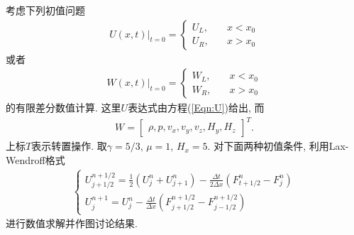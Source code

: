 \documentclass[10.5pt
]{article}
\begin{document}
考虑下列初值问题
\begin{align}
U(x,t)|_{t=0} = \left\{ \begin{array}{ll}
U_L, & \quad x < x_0 \\
U_R, & \quad x > x_0
\end{array} \right.
\end{align}
或者
\begin{align}
W(x,t)|_{t=0} = \left\{ \begin{array}{ll}
W_L, & \quad x < x_0 \\
W_R, & \quad x > x_0
\end{array} \right.
\end{align}
的有限差分数值计算. 这里$U$表达式由方程(\ref{Eqn:U})给出, 而
\begin{align}
W = \left[ \begin{array}{ccccccc}
\rho,
p,
v_x,
v_y,
v_z,
H_y,
H_z
\end{array} \right]^T.
\end{align}
上标$T$表示转置操作. 取$\gamma=5/3$, $\mu=1$, $H_x=5$. 对下面两种初值条件,
利用Lax-Wendroff格式\citep{Zheng2019}
\begin{align}
\left\{\begin{array}{ll}{U_{j+1 / 2}^{n+1 / 2}=\frac{1}{2}\left(U_{j}^{n}+U_{j+1}^{n}\right)-\frac{\Delta t}{2\Delta x}\left(F_{t+1 / 2}^{n}-F_{j}^{n}\right)} \\ {U_{j}^{n+1}=U_{j}^{n}-\frac{\Delta t}{\Delta x}\left(F_{j+1 / 2}^{n+1 / 2}-F_{j-1 / 2}^{n+1 / 2}\right)}\end{array}\right.
\end{align}
进行数值求解并作图讨论结果.
\end{document}

